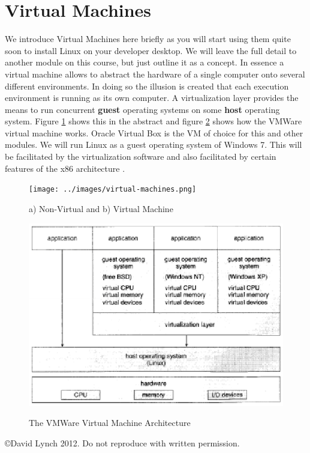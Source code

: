 \documentclass[10pt,a4paper]{article}
\begin{document}
\section{Virtual Machines}
We introduce Virtual Machines here briefly as you will start using them quite soon to install Linux on your developer desktop. We will leave the full detail to another module on this course, but just outline it as a concept. In essence a virtual machine allows to abstract the hardware of a single computer onto several different environments. In doing so the illusion is created that each execution environment is running as its own computer. A virtualization layer provides the means to run concurrent {\bf guest} operating systems on some {\bf host} operating system. Figure \ref{virtualmachines} shows this in the abstract and figure \ref{vmarch} shows how the VMWare virtual machine works. Oracle Virtual Box \cite{VIRTUALBOX} is the VM of choice for this and other modules. We will run Linux as a guest operating system of Windows 7. This will be facilitated by the virtualization software and also facilitated by certain features of the x86 architecture \cite{INTELSWDEV}.
\begin{figure}
\caption{a) Non-Virtual and b) Virtual Machine \cite{OSCONCEPTS}}
\begin{center}
\texttt{[image: ../images/virtual-machines.png]}
\label{virtualmachines}
\end{center}
\end{figure}
\begin{figure}
\caption{The VMWare Virtual Machine Architecture \cite{OSCONCEPTS}}
\begin{center}
\includegraphics[scale=0.45]{../images/vm-arch.png}
\label{vmarch}
\end{center}
\end{figure}
{}

\begin{center}
{\small \copyright  David Lynch 2012. Do not reproduce with written permission.}
\end{center}
\end{document}
